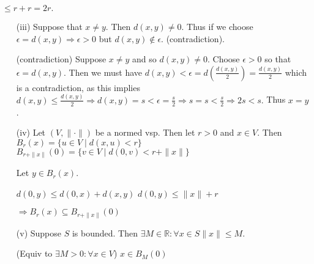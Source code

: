 \documentclass{article}
\theoremstyle{definition}
\numberwithin{equation}{section}
\begin{document}
$
\leq r + r = 2r.
$

\begin{itemize}
    \item[(iii)] Suppose that \( x \neq y \). Then \( d(x,y) \neq 0 \). Thus if we choose \( \epsilon = d(x,y) \Rightarrow \epsilon > 0 \) but \( d(x,y) \notin \epsilon \). (contradiction).  

    (contradiction) Suppose \( x \neq y \) and so \( d(x,y) \neq 0 \).
    Choose \( \epsilon > 0 \) so that \( \epsilon = d(x,y) \). Then we must have
    $
    d(x,y) < \epsilon = d \left( \frac{d(x,y)}{2} \right) = \frac{d(x,y)}{2}
    $
    which is a contradiction, as this implies
    $
    d(x,y) \leq \frac{d(x,y)}{2}
    \Rightarrow d(x,y) = s < \epsilon = \frac{s}{2}
    \Rightarrow s = s < \frac{s}{2}
    \Rightarrow 2s < s.
    $
    Thus \( x = y \).

    \item[(iv)] Let \( (V, \| \cdot \|) \) be a normed vsp. Then let \( r > 0 \) and \( x \in V \). Then
    $
    B_r(x) = \{ u \in V \mid d(x,u) < r \}
    $
    $
    B_{r + \| x \|}(0) = \{ v \in V \mid d(0,v) < r + \| x \| \}
    $

    \begin{center}
    \end{center}

    Let \( y \in B_r(x) \).

    $
    d(0,y) \leq d(0,x) + d(x,y)
    $
    $
    d(0,y) \leq \| x \| + r
    $

    $
    \Rightarrow B_r(x) \subseteq B_{r+\| x \|}(0)
    $

    \item[(v)] Suppose \( S \) is bounded. Then \( \exists M \in \mathbb{R} : \forall x \in S \| x \| \leq M \).

    (Equiv to \( \exists M > 0 : \forall x \in V \))
    $
    x \in B_M(0)
    $
\end{itemize}
\end{document}
